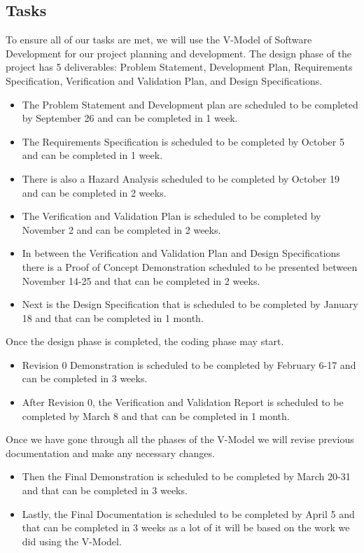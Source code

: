\documentclass[12pt, titlepage]{article}
\begin{document}
\subsection{Tasks}
To ensure all of our tasks are met, we will use the V-Model of Software Development for our project planning and development. The design phase of the project has 5 deliverables: Problem Statement, Development Plan, Requirements Specification, Verification and Validation Plan, and Design Specifications.

\begin{itemize}
    \item The Problem Statement and Development plan are scheduled to be completed by September 26 and can be completed in 1 week. 
    \item The Requirements Specification is scheduled to be completed by October 5 and can be completed in 1 week. 
    \item There is also a Hazard Analysis scheduled to be completed by October 19 and can be completed in 2 weeks. 
    \item The Verification and Validation Plan is scheduled to be completed by November 2 and can be completed in 2 weeks. 
    \item In between the Verification and Validation Plan and Design Specifications there is a Proof of Concept Demonstration scheduled to be presented between November 14-25 and that can be completed in 2 weeks. 
    \item Next is the Design Specification that is scheduled to be completed by January 18 and that can be completed in 1 month.
\end{itemize}

Once the design phase is completed, the coding phase may start. 
\begin{itemize}
    \item Revision 0 Demonstration is scheduled to be completed by February 6-17 and can be completed in 3 weeks.
    \item After Revision 0, the Verification and Validation Report is scheduled to be completed by March 8 and that can be completed in 1 month.
\end{itemize}

Once we have gone through all the phases of the V-Model we will revise previous documentation and make any necessary changes. 

\begin{itemize}
    \item Then the Final Demonstration is scheduled to be completed by March 20-31 and that can be completed in 3 weeks.
    \item Lastly, the Final Documentation is scheduled to be completed by April 5 and that can be completed in 3 weeks as a lot of it will be based on the work we did using the V-Model.
\end{itemize}
\end{document}
